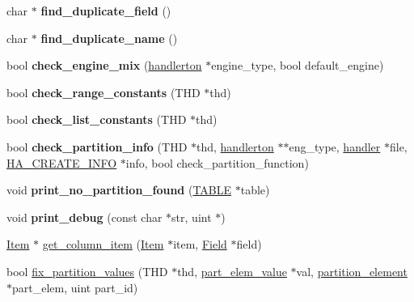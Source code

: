 \begin{DoxyCompactItemize}
char $\ast$ {\bfseries find\+\_\+duplicate\+\_\+field} ()
\item 
\mbox{\label{classpartition__info_a422f87390f55b84a0d699ddda97936fd}} 
char $\ast$ {\bfseries find\+\_\+duplicate\+\_\+name} ()
\item 
\mbox{\label{classpartition__info_ae5eb06a50b6b6bbfb18ae23e11ac0cb2}} 
bool {\bfseries check\+\_\+engine\+\_\+mix} (\mbox{\hyperlink{structhandlerton}{handlerton}} $\ast$engine\+\_\+type, bool default\+\_\+engine)
\item 
\mbox{\label{classpartition__info_abdd5fceb6d9c7a8b3975bee9cf56005e}} 
bool {\bfseries check\+\_\+range\+\_\+constants} (T\+HD $\ast$thd)
\item 
\mbox{\label{classpartition__info_a99cf27906251b4ca4e3477a74c4f58a1}} 
bool {\bfseries check\+\_\+list\+\_\+constants} (T\+HD $\ast$thd)
\item 
\mbox{\label{classpartition__info_a37f67216b15dcf72ca525d9886e349f9}} 
bool {\bfseries check\+\_\+partition\+\_\+info} (T\+HD $\ast$thd, \mbox{\hyperlink{structhandlerton}{handlerton}} $\ast$$\ast$eng\+\_\+type, \mbox{\hyperlink{classhandler}{handler}} $\ast$file, \mbox{\hyperlink{structst__ha__create__information}{H\+A\+\_\+\+C\+R\+E\+A\+T\+E\+\_\+\+I\+N\+FO}} $\ast$info, bool check\+\_\+partition\+\_\+function)
\item 
\mbox{\label{classpartition__info_a489d116176a8f50a822f2a8ac169db49}} 
void {\bfseries print\+\_\+no\+\_\+partition\+\_\+found} (\mbox{\hyperlink{structTABLE}{T\+A\+B\+LE}} $\ast$table)
\item 
\mbox{\label{classpartition__info_ab96d993193c15c1d60f3143afb25af49}} 
void {\bfseries print\+\_\+debug} (const char $\ast$str, uint $\ast$)
\item 
\mbox{\hyperlink{classItem}{Item}} $\ast$ \mbox{\hyperlink{classpartition__info_a4c064402f7f3865b0160d53002eb9cde}{get\+\_\+column\+\_\+item}} (\mbox{\hyperlink{classItem}{Item}} $\ast$item, \mbox{\hyperlink{classField}{Field}} $\ast$field)
\item 
bool \mbox{\hyperlink{classpartition__info_a98dd2b320d2cca66c97e8741997a6156}{fix\+\_\+partition\+\_\+values}} (T\+HD $\ast$thd, \mbox{\hyperlink{structp__elem__val}{part\+\_\+elem\+\_\+value}} $\ast$val, \mbox{\hyperlink{classpartition__element}{partition\+\_\+element}} $\ast$part\+\_\+elem, uint part\+\_\+id)
$$
\end{DoxyCompactItemize}
